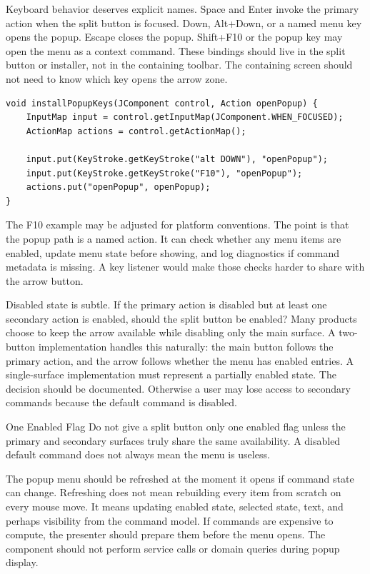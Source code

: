 Keyboard behavior deserves explicit names. Space and Enter invoke the primary action
when the split button is focused. Down, Alt+Down, or a named menu key opens the popup.
Escape closes the popup. Shift+F10 or the popup key may open the menu as a context
command. These bindings should live in the split button or installer, not in the
containing toolbar. The containing screen should not need to know which key opens the
arrow zone.

\begin{lstlisting}[caption={Keyboard bindings make the popup a command path.}]
void installPopupKeys(JComponent control, Action openPopup) {
    InputMap input = control.getInputMap(JComponent.WHEN_FOCUSED);
    ActionMap actions = control.getActionMap();

    input.put(KeyStroke.getKeyStroke("alt DOWN"), "openPopup");
    input.put(KeyStroke.getKeyStroke("F10"), "openPopup");
    actions.put("openPopup", openPopup);
}
\end{lstlisting}

The F10 example may be adjusted for platform conventions. The point is that the popup
path is a named action. It can check whether any menu items are enabled, update menu
state before showing, and log diagnostics if command metadata is missing. A key listener
would make those checks harder to share with the arrow button.

Disabled state is subtle. If the primary action is disabled but at least one secondary
action is enabled, should the split button be enabled? Many products choose to keep the
arrow available while disabling only the main surface. A two-button implementation
handles this naturally: the main button follows the primary action, and the arrow
follows whether the menu has enabled entries. A single-surface implementation must
represent a partially enabled state. The decision should be documented. Otherwise a user
may lose access to secondary commands because the default command is disabled.

\begin{pitfallbox}{One Enabled Flag}
Do not give a split button only one enabled flag unless the primary and secondary
surfaces truly share the same availability. A disabled default command does not always
mean the menu is useless.
\end{pitfallbox}

The popup menu should be refreshed at the moment it opens if command state can change.
Refreshing does not mean rebuilding every item from scratch on every mouse move. It
means updating enabled state, selected state, text, and perhaps visibility from the
command model. If commands are expensive to compute, the presenter should prepare them
before the menu opens. The component should not perform service calls or domain queries
during popup display.

